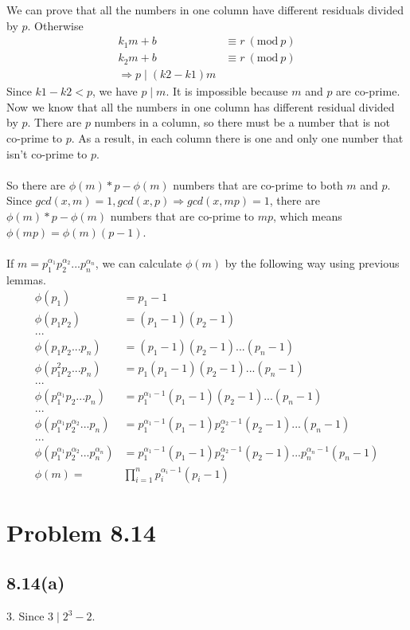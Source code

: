 \documentclass[acmlarge,screen]{acmart}
\begin{document}
\begin{CJK*}{UTF8}{gbsn}
We can prove that all the numbers in one column have different residuals divided by $p$. Otherwise
\begin{align*}
	k_1m+b&\equiv r\ (\text{mod}\ p)\\
	k_2m+b&\equiv r\ (\text{mod}\ p)\\
	\Rightarrow p \mid(k2-k1)m
\end{align*}
Since $k1-k2<p$, we have $p\mid m$. It is impossible because $m$ and $p$ are co-prime. Now we know that all the numbers in one column has different residual divided by $p$. There are $p$ numbers in a column, so there must be a number that is not co-prime to $p$. As a result, in each column there is one and only one number that isn't co-prime to $p$.\\\\
So there are $\phi(m)*p-\phi(m)$ numbers that are co-prime to both $m$ and $p$. Since $gcd(x, m)=1, gcd(x, p) \Rightarrow gcd(x, mp)=1$, there are $\phi(m)*p-\phi(m)$ numbers that are co-prime to $mp$, which means $\phi(mp)=\phi(m)(p-1)$.\\\\
If $m=p_1^{\alpha_1}p_2^{\alpha_2}...p_n^{\alpha_n}$, we can calculate $\phi(m)$ by the following way using previous lemmas.
\begin{align*}
	\phi(p_1)&=p_1-1\\
	\phi(p_1p_2)&=(p_1-1)(p_2-1)\\
	...\\
	\phi(p_1p_2...p_n)&=(p_1-1)(p_2-1)...(p_n-1)\\
	\phi(p_1^2p_2...p_n)&=p_1(p_1-1)(p_2-1)...(p_n-1)\\
	...\\
	\phi(p_1^{\alpha_1}p_2...p_n)&=p_1^{\alpha_1-1}(p_1-1)(p_2-1)...(p_n-1)\\
	...\\
	\phi(p_1^{\alpha_1}p_2^{\alpha_2}...p_n)&=p_1^{\alpha_1-1}(p_1-1)p_2^{\alpha_2-1}(p_2-1)...(p_n-1)\\
	...\\
	\phi(p_1^{\alpha_1}p_2^{\alpha_2}...p_n^{\alpha_n})&=p_1^{\alpha_1-1}(p_1-1)p_2^{\alpha_2-1}(p_2-1)...p_n^{\alpha_n-1}(p_n-1)\\
	\phi(m)=&\prod_{i=1}^{n}p_i^{\alpha_i-1}(p_i-1) 
\end{align*}
\section{Problem 8.14}
\subsection{8.14(a)}
$3$. Since $3\mid 2^3-2$.

\end{CJK*}
\end{document}
